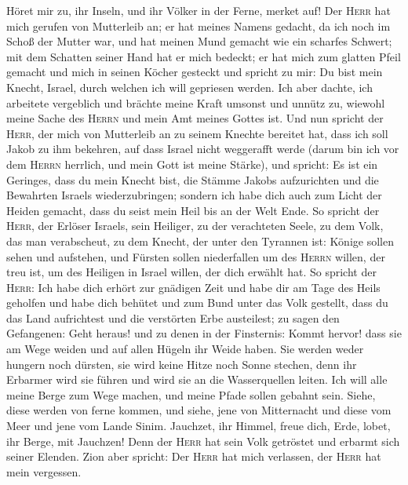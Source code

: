  Höret mir zu, ihr Inseln, und ihr Völker in der Ferne,
merket auf! Der \textsc{Herr} hat mich gerufen von Mutterleib an; er hat
meines Namens gedacht, da ich noch im Schoß der Mutter war,
 und hat meinen Mund gemacht wie ein scharfes Schwert; mit
dem Schatten seiner Hand hat er mich bedeckt; er hat mich zum glatten
Pfeil gemacht und mich in seinen Köcher gesteckt  und
spricht zu mir: Du bist mein Knecht, Israel, durch welchen ich will
gepriesen werden.  Ich aber dachte, ich arbeitete
vergeblich und brächte meine Kraft umsonst und unnütz zu, wiewohl meine
Sache des \textsc{Herrn} und mein Amt meines Gottes ist. 
Und nun spricht der \textsc{Herr}, der mich von Mutterleib an zu seinem
Knechte bereitet hat, dass ich soll Jakob zu ihm bekehren, auf dass
Israel nicht weggerafft werde (darum bin ich vor dem \textsc{Herrn}
herrlich, und mein Gott ist meine Stärke),  und spricht:
Es ist ein Geringes, dass du mein Knecht bist, die Stämme Jakobs
aufzurichten und die Bewahrten Israels wiederzubringen; sondern ich habe
dich auch zum Licht der Heiden gemacht, dass du seist mein Heil bis an
der Welt Ende.  So spricht der \textsc{Herr}, der Erlöser
Israels, sein Heiliger, zu der verachteten Seele, zu dem Volk, das man
verabscheut, zu dem Knecht, der unter den Tyrannen ist: Könige sollen
sehen und aufstehen, und Fürsten sollen niederfallen um des
\textsc{Herrn} willen, der treu ist, um des Heiligen in Israel willen,
der dich erwählt hat.  So spricht der \textsc{Herr}: Ich
habe dich erhört zur gnädigen Zeit und habe dir am Tage des Heils
geholfen und habe dich behütet und zum Bund unter das Volk gestellt,
dass du das Land aufrichtest und die verstörten Erbe austeilest;
 zu sagen den Gefangenen: Geht heraus! und zu denen in der
Finsternis: Kommt hervor! dass sie am Wege weiden und auf allen Hügeln
ihr Weide haben.  Sie werden weder hungern noch dürsten,
sie wird keine Hitze noch Sonne stechen, denn ihr Erbarmer wird sie
führen und wird sie an die Wasserquellen leiten.  Ich
will alle meine Berge zum Wege machen, und meine Pfade sollen gebahnt
sein.  Siehe, diese werden von ferne kommen, und siehe,
jene von Mitternacht und diese vom Meer und jene vom Lande Sinim.
 Jauchzet, ihr Himmel, freue dich, Erde, lobet, ihr
Berge, mit Jauchzen! Denn der \textsc{Herr} hat sein Volk getröstet und
erbarmt sich seiner Elenden.  Zion aber spricht: Der
\textsc{Herr} hat mich verlassen, der \textsc{Herr} hat mein vergessen.
